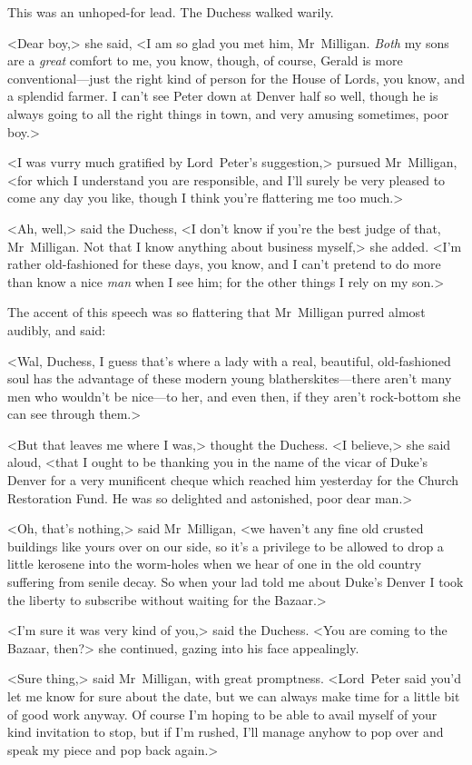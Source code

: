 This was an unhoped-for lead. The Duchess walked warily.

<Dear boy,> she said, <I am so glad you met him, Mr~Milligan. \textit{Both} my sons are a \emph{great} comfort to me, you know, though, of course, Gerald is more conventional—just the right kind of person for the House of Lords, you know, and a splendid farmer. I can't see Peter down at Denver half so well, though he is always going to all the right things in town, and very amusing sometimes, poor boy.>

<I was vurry much gratified by Lord~Peter's suggestion,> pursued Mr~Milligan, <for which I understand you are responsible, and I'll surely be very pleased to come any day you like, though I think you're flattering me too much.>

<Ah, well,> said the Duchess, <I don't know if you're the best judge of that, Mr~Milligan. Not that I know anything about business myself,> she added. <I'm rather old-fashioned for these days, you know, and I can't pretend to do more than know a nice \emph{man} when I see him; for the other things I rely on my son.>

The accent of this speech was so flattering that Mr~Milligan purred almost audibly, and said:

<Wal, Duchess, I guess that's where a lady with a real, beautiful, old-fashioned soul has the advantage of these modern young blatherskites—there aren't many men who wouldn't be nice—to her, and even then, if they aren't rock-bottom she can see through them.>

<But that leaves me where I was,> thought the Duchess. <I believe,> she said aloud, <that I ought to be thanking you in the name of the vicar of Duke's Denver for a very munificent cheque which reached him yesterday for the Church Restoration Fund. He was so delighted and astonished, poor dear man.>

<Oh, that's nothing,> said Mr~Milligan, <we haven't any fine old crusted buildings like yours over on our side, so it's a privilege to be allowed to drop a little kerosene into the worm-holes when we hear of one in the old country suffering from senile decay. So when your lad told me about Duke's Denver I took the liberty to subscribe without waiting for the Bazaar.>

<I'm sure it was very kind of you,> said the Duchess. <You are coming to the Bazaar, then?> she continued, gazing into his face appealingly.

<Sure thing,> said Mr~Milligan, with great promptness. <Lord~Peter said you'd let me know for sure about the date, but we can always make time for a little bit of good work anyway. Of course I'm hoping to be able to avail myself of your kind invitation to stop, but if I'm rushed, I'll manage anyhow to pop over and speak my piece and pop back again.>

